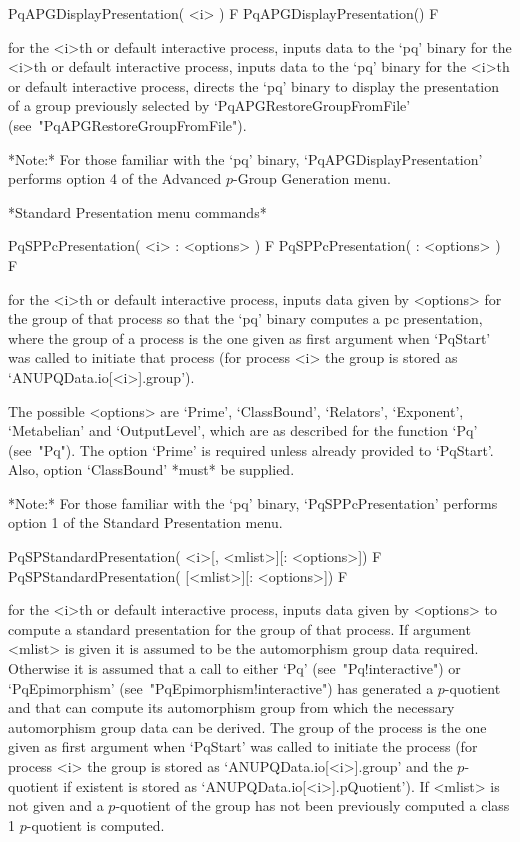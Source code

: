 \>PqAPGDisplayPresentation( <i> ) F
\>PqAPGDisplayPresentation() F

for the <i>th or default interactive {\ANUPQ} process, inputs data to the
`pq' binary for the <i>th or default interactive {\ANUPQ} process, inputs
data to the `pq' binary for the <i>th  or  default  interactive  {\ANUPQ}
process, directs the `pq' binary to display the presentation of  a  group
previously        selected         by         `PqAPGRestoreGroupFromFile'
(see~"PqAPGRestoreGroupFromFile").

*Note:*
For those  familiar  with  the  `pq'  binary,  `PqAPGDisplayPresentation'
performs option 4 of the Advanced $p$-Group Generation menu.

*Standard Presentation menu commands*

\>PqSPPcPresentation( <i> : <options> ) F
\>PqSPPcPresentation( : <options> ) F

for the <i>th or default interactive {\ANUPQ} process, inputs data  given
by <options> for the group of  that  process  so  that  the  `pq'  binary
computes a pc presentation, where the group of a process is the one given
as first argument when `PqStart' was called to initiate that process (for
process <i> the group is stored as `ANUPQData.io[<i>].group').

The possible <options> are `Prime', `ClassBound', `Relators', `Exponent',
`Metabelian' and `OutputLevel', which are as described for  the  function
`Pq' (see~"Pq"). The option `Prime' is required unless  already  provided
to `PqStart'. Also, option `ClassBound' *must* be supplied.

*Note:* For those familiar with  the  `pq'  binary,  `PqSPPcPresentation'
performs option 1 of the Standard Presentation menu.

\>PqSPStandardPresentation( <i>[, <mlist>][: <options>]) F
\>PqSPStandardPresentation( [<mlist>][: <options>]) F

for the <i>th or default interactive {\ANUPQ} process, inputs data  given
by <options> to compute a standard presentation for  the  group  of  that
process.  If  argument  <mlist>  is  given  it  is  assumed  to  be   the
automorphism group data required. Otherwise it is assumed that a call  to
either      `Pq'      (see~"Pq!interactive")      or      `PqEpimorphism'
(see~"PqEpimorphism!interactive") has generated a $p$-quotient  and  that
{\GAP} can compute  its  automorphism  group  from  which  the  necessary
automorphism group data can be derived. The group of the process  is  the
one given as first argument when `PqStart' was  called  to  initiate  the
process (for process <i> the group is stored as `ANUPQData.io[<i>].group'
and     the     $p$-quotient     if     existent     is     stored     as
`ANUPQData.io[<i>].pQuotient').  If  <mlist>   is   not   given   and   a
$p$-quotient of the group has not been  previously  computed  a  class  1
$p$-quotient is computed.

